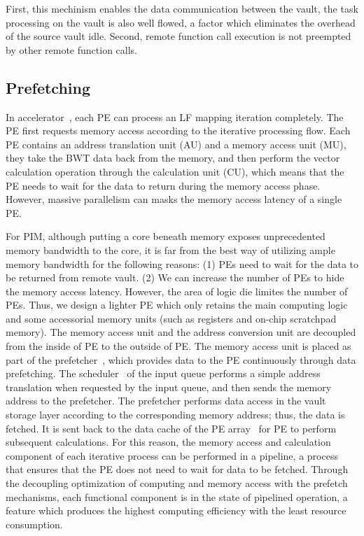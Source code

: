\documentclass[9pt,conference]{IEEEtran}
\newcommand*\circled[1]{\tikz[baseline=(char.base)]{
		\node[shape=circle,fill,inner sep=0.5pt] (char) {\textcolor{white}{#1}};}}
\begin{document}
First, this mechinism enables the data communication between the vault, the task processing on the vault is also well flowed, a factor which eliminates the overhead of the source vault idle. Second, remote function call execution is not preempted by other remote function calls.

\subsection{Prefetching}
\label{sec:arch:prefetch}
In accelerator~\cite{yuanrong}, each PE can process an LF mapping iteration completely. The PE first requests memory access according to the iterative processing flow. Each PE contains an address translation unit (AU) and a memory access unit (MU), they take the BWT data back from the memory, and then perform the vector calculation operation through the calculation unit (CU), which means that the PE needs to wait for the data to return during the memory access phase. However, massive parallelism can masks the memory access latency of a single PE. 

For PIM, although putting a core beneath memory exposes unprecedented memory bandwidth to the core, it is far from the best way of utilizing ample memory bandwidth for the
following reasons: (1) PEs need to wait for the data to be returned from remote vault. (2) We can increase the number of PEs to hide the memory access latency. However, the area of logic die limites the number of PEs. Thus, we design a lighter PE which only retains the main computing logic and some accessorial memory units (such as registers and on-chip scratchpad memory). The memory access unit and the address conversion unit are decoupled from the inside of PE to the outside of PE. The memory access unit is placed as part of the prefetcher~\circled{2}, which provides data to the PE continuously through data prefetching. The scheduler~\circled{1} of the input queue performs a simple address translation when requested by the input queue, and then sends the memory address to the prefetcher. The prefetcher performs data access in the vault storage layer according to the corresponding memory address; thus, the data is fetched. It is sent back to the data cache of the PE array~\circled{3} for PE to perform subsequent calculations. For this reason, the memory access and calculation component of each iterative process can be performed in a pipeline, a process that ensures that the PE does not need to wait for data to be fetched. Through the decoupling optimization of computing and memory access with the prefetch mechanisms, each functional component is in the state of pipelined operation, a feature which produces the highest computing efficiency with the least resource consumption.
\end{document}
